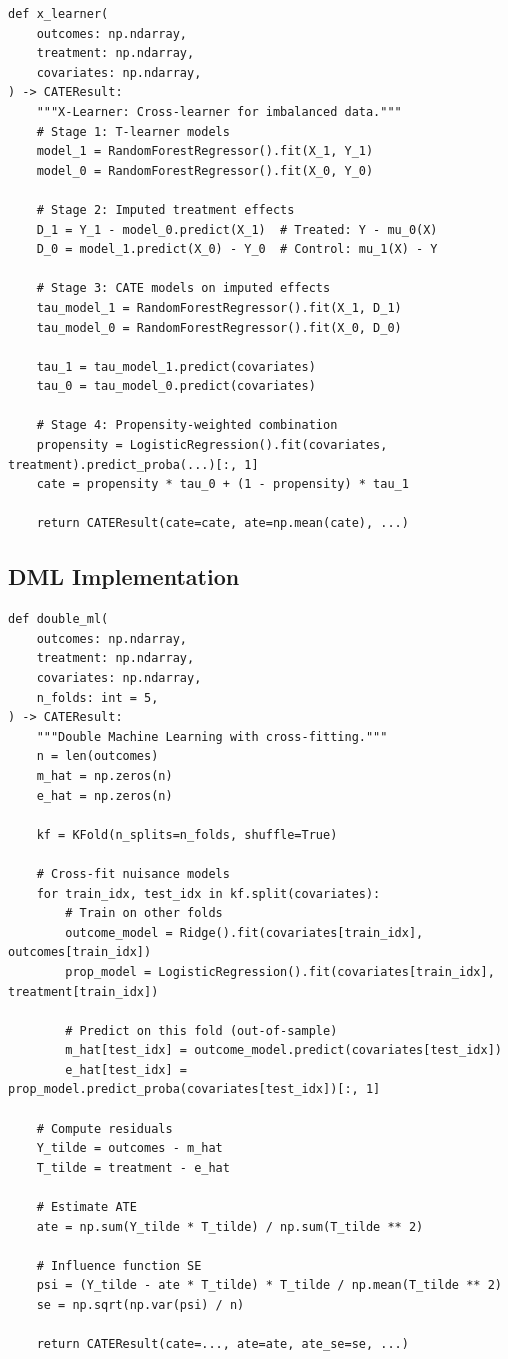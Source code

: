 \begin{verbatim}
def x_learner(
    outcomes: np.ndarray,
    treatment: np.ndarray,
    covariates: np.ndarray,
) -> CATEResult:
    """X-Learner: Cross-learner for imbalanced data."""
    # Stage 1: T-learner models
    model_1 = RandomForestRegressor().fit(X_1, Y_1)
    model_0 = RandomForestRegressor().fit(X_0, Y_0)

    # Stage 2: Imputed treatment effects
    D_1 = Y_1 - model_0.predict(X_1)  # Treated: Y - mu_0(X)
    D_0 = model_1.predict(X_0) - Y_0  # Control: mu_1(X) - Y

    # Stage 3: CATE models on imputed effects
    tau_model_1 = RandomForestRegressor().fit(X_1, D_1)
    tau_model_0 = RandomForestRegressor().fit(X_0, D_0)

    tau_1 = tau_model_1.predict(covariates)
    tau_0 = tau_model_0.predict(covariates)

    # Stage 4: Propensity-weighted combination
    propensity = LogisticRegression().fit(covariates, treatment).predict_proba(...)[:, 1]
    cate = propensity * tau_0 + (1 - propensity) * tau_1

    return CATEResult(cate=cate, ate=np.mean(cate), ...)
\end{verbatim}

\subsection{DML Implementation}

\begin{verbatim}
def double_ml(
    outcomes: np.ndarray,
    treatment: np.ndarray,
    covariates: np.ndarray,
    n_folds: int = 5,
) -> CATEResult:
    """Double Machine Learning with cross-fitting."""
    n = len(outcomes)
    m_hat = np.zeros(n)
    e_hat = np.zeros(n)

    kf = KFold(n_splits=n_folds, shuffle=True)

    # Cross-fit nuisance models
    for train_idx, test_idx in kf.split(covariates):
        # Train on other folds
        outcome_model = Ridge().fit(covariates[train_idx], outcomes[train_idx])
        prop_model = LogisticRegression().fit(covariates[train_idx], treatment[train_idx])

        # Predict on this fold (out-of-sample)
        m_hat[test_idx] = outcome_model.predict(covariates[test_idx])
        e_hat[test_idx] = prop_model.predict_proba(covariates[test_idx])[:, 1]

    # Compute residuals
    Y_tilde = outcomes - m_hat
    T_tilde = treatment - e_hat

    # Estimate ATE
    ate = np.sum(Y_tilde * T_tilde) / np.sum(T_tilde ** 2)

    # Influence function SE
    psi = (Y_tilde - ate * T_tilde) * T_tilde / np.mean(T_tilde ** 2)
    se = np.sqrt(np.var(psi) / n)

    return CATEResult(cate=..., ate=ate, ate_se=se, ...)
\end{verbatim}

